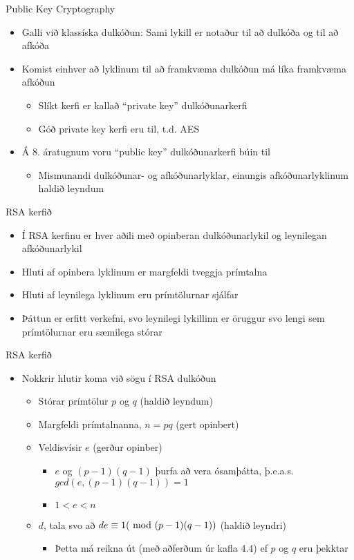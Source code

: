 \documentclass[handout]{beamer}
\begin{document}
\begin{frame}{Public Key Cryptography}
\begin{itemize}
 \item Galli við klassíska dulkóðun: Sami lykill er notaður til að dulkóða og til að afkóða
 \item Komist einhver að lyklinum til að framkvæma dulkóðun má líka framkvæma afkóðun
 \begin{itemize}
  \item Slíkt kerfi er kallað ``private key'' dulkóðunarkerfi
  \item Góð private key kerfi eru til, t.d. AES
 \end{itemize}
 \item Á 8. áratugnum voru ``public key'' dulkóðunarkerfi búin til
 \begin{itemize}
  \item Mismunandi dulkóðunar- og afkóðunarlyklar, einungis afkóðunarlyklinum haldið leyndum
 \end{itemize}
\end{itemize}
\end{frame}

\begin{frame}{RSA kerfið}
\begin{itemize}
 \item Í RSA kerfinu er hver aðili með opinberan dulkóðunarlykil og leynilegan afkóðunarlykil
 \item Hluti af opinbera lyklinum er margfeldi tveggja prímtalna
 \item Hluti af leynilega lyklinum eru prímtölurnar sjálfar
 \item Þáttun er erfitt verkefni, svo leynilegi lykillinn er öruggur svo lengi sem prímtölurnar eru sæmilega stórar
\end{itemize}
\end{frame}

\begin{frame}{RSA kerfið}
\begin{itemize}
 \item Nokkrir hlutir koma við sögu í RSA dulkóðun
 \begin{itemize}
  \item Stórar prímtölur $p$ og $q$ (haldið leyndum)
  \item Margfeldi prímtalnanna, $n = pq$ (gert opinbert)
  \item Veldisvísir $e$ (gerður opinber)
  \begin{itemize}
   \item $e$ og $(p-1)(q-1)$ þurfa að vera ósamþátta, þ.e.a.s. $gcd(e, (p-1)(q-1)) = 1$
   \item $1 < e < n$
  \end{itemize}
  \item $d$, tala svo að $de \equiv 1 (\ \text{mod}\ (p-1)(q-1))$ (haldið leyndri)
  \begin{itemize}
   \item Þetta má reikna út (með aðferðum úr kafla 4.4) ef $p$ og $q$ eru þekktar
  \end{itemize}
 \end{itemize}
\end{itemize}
\end{frame}
\end{document}
